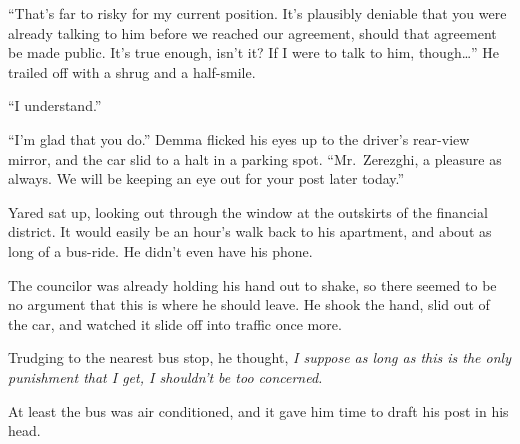 ``That's far to risky for my current position. It's plausibly deniable that you were already talking to him before we reached our agreement, should that agreement be made public. It's true enough, isn't it? If I were to talk to him, though\ldots{}'' He trailed off with a shrug and a half-smile.

``I understand.''

``I'm glad that you do.'' Demma flicked his eyes up to the driver's rear-view mirror, and the car slid to a halt in a parking spot. ``Mr.~Zerezghi, a pleasure as always. We will be keeping an eye out for your post later today.''

Yared sat up, looking out through the window at the outskirts of the financial district. It would easily be an hour's walk back to his apartment, and about as long of a bus-ride. He didn't even have his phone.

The councilor was already holding his hand out to shake, so there seemed to be no argument that this is where he should leave. He shook the hand, slid out of the car, and watched it slide off into traffic once more.

Trudging to the nearest bus stop, he thought, \emph{I suppose as long as this is the only punishment that I get, I shouldn't be too concerned.}

At least the bus was air conditioned, and it gave him time to draft his post in his head.

